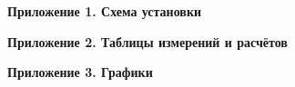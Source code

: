 \documentclass[12pt]{article}
\begin{document}
    

    \clearpage

    \begin{center}
        \LARGE
        \textbf{Приложение 1. Схема установки}
    \end{center}

    \mediumvspace

    

    \clearpage

    \begin{center}
        \LARGE
        \textbf{Приложение 2. Таблицы измерений и расчётов}
    \end{center}

    \mediumvspace

    

    

    \clearpage

    \begin{center}
        \LARGE
        \textbf{Приложение 3. Графики}
    \end{center}

    \mediumvspace

    
\end{document}

